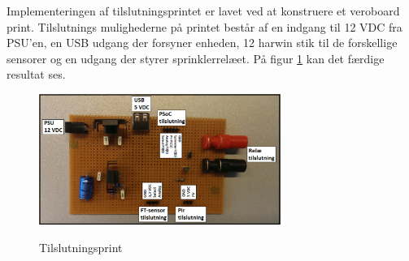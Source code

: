 Implementeringen af tilslutningsprintet er lavet ved at konstruere et veroboard print. Tilslutnings mulighederne på printet består af en indgang til 12 VDC fra PSU'en, en USB udgang der forsyner enheden, 12 harwin stik til de forskellige sensorer og en udgang der styrer sprinklerrelæet. På figur \ref{lab:Tilslutningsprint} kan det færdige resultat ses. 

\begin{figure}[htb]
\centering
{\includegraphics[width=0.70\textwidth]{filer/pics/Tilslutningsprint}}
\caption{Tilslutningsprint}
\label{lab:Tilslutningsprint}
\end{figure}


